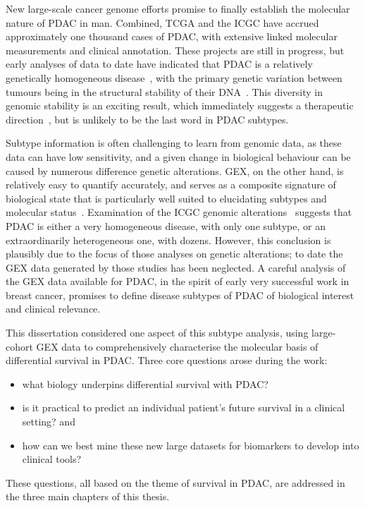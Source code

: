 \documentclass[thesis.tex]{subfiles}
\begin{document}
New large-scale cancer genome efforts promise to finally establish the molecular nature of \gls{PDAC} in man.  Combined, \gls{TCGA} and the \gls{ICGC} have accrued approximately one thousand cases of \gls{PDAC}, with extensive linked molecular measurements and clinical annotation.  These projects are still in progress, but early analyses of data to date have indicated that \gls{PDAC} is a relatively genetically homogeneous disease~\cite{Biankin2012}, with the primary genetic variation between tumours being in the structural stability of their DNA~\cite{Waddell2015}.  This diversity in genomic stability is an exciting result, which immediately suggests a therapeutic direction~\cite{Waddell2015}, but is unlikely to be the last word in \gls{PDAC} subtypes.

Subtype information is often challenging to learn from genomic data, as these data can have low sensitivity, and a given change in biological behaviour can be caused by numerous difference genetic alterations.  \Gls{GEX}, on the other hand, is relatively easy to quantify accurately, and serves as a composite signature of biological state that is particularly well suited to elucidating subtypes and molecular status~\cite{Ray2014}.  Examination of the \gls{ICGC} genomic alterations~\cite{Biankin2012, Waddell2015} suggests that \gls{PDAC} is either a very homogeneous disease, with only one subtype, or an extraordinarily heterogeneous one, with dozens.  However, this conclusion is plausibly due to the focus of those analyses on genetic alterations; to date the \gls{GEX} data generated by those studies has been neglected.  A careful analysis of the \gls{GEX} data available for \gls{PDAC}, in the spirit of early very successful work in breast cancer, promises to define disease subtypes of \gls{PDAC} of biological interest and clinical relevance.

This dissertation considered one aspect of this subtype analysis, using large-cohort \gls{GEX} data to comprehensively characterise the molecular basis of differential survival in \gls{PDAC}.  Three core questions arose during the work: 
\begin{itemize}
\item what biology underpins differential survival with \gls{PDAC}?
\item is it practical to predict an individual patient's future survival in a clinical setting? and
\item how can we best mine these new large datasets for biomarkers to develop into clinical tools?
\end{itemize}
These questions, all based on the theme of survival in \gls{PDAC}, are addressed in the three main chapters of this thesis.
\end{document}
